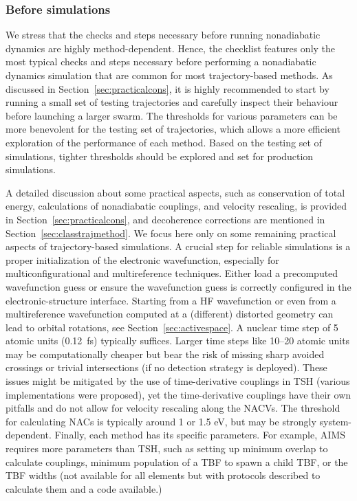 \documentclass[9pt,bestpractices]{livecoms}
\begin{document}
\subsubsection{Before simulations}
We stress that the checks and steps necessary before running nonadiabatic dynamics are highly method-dependent. Hence, the checklist features only the most typical checks and steps necessary before performing a nonadiabatic dynamics simulation that are common for most trajectory-based methods. As discussed in Section~\ref{sec:practicalcons}, it is highly recommended to start by running a small set of testing trajectories and carefully inspect their behaviour before launching a larger swarm. The thresholds for various parameters can be more benevolent for the testing set of trajectories, which allows a more efficient exploration of the performance of each method. Based on the testing set of simulations, tighter thresholds should be explored and set for production simulations.

A detailed discussion about some practical aspects, such as conservation of total energy, calculations of nonadiabatic couplings, and velocity rescaling, is provided in Section~\ref{sec:practicalcons}, and decoherence corrections are mentioned in Section~\ref{sec:classtrajmethod}. We focus here only on some remaining practical aspects of trajectory-based simulations. A crucial step for reliable simulations is a proper initialization of the electronic wavefunction, especially for multiconfigurational and multireference techniques. Either load a precomputed wavefunction guess or ensure the wavefunction guess is correctly configured in the electronic-structure interface. Starting from a HF wavefunction or even from a multireference wavefunction computed at a (different) distorted geometry can lead to orbital rotations, see Section~\ref{sec:activespace}. 
A nuclear time step of 5 atomic units (0.12~fs) typically suffices. Larger time steps like 10–20 atomic units may be computationally cheaper but bear the risk of missing sharp avoided crossings or trivial intersections (if no detection strategy is deployed). These issues might be mitigated by the use of time-derivative couplings in TSH (various implementations were proposed), yet the time-derivative couplings have their own pitfalls and do not allow for velocity rescaling along the NACVs. The threshold for calculating NACs is typically around 1 or 1.5 eV, but may be strongly system-dependent.
Finally, each method has its specific parameters. For example, AIMS requires more parameters than TSH,\cite{lassmann2023} such as setting up minimum overlap to calculate couplings, minimum population of a TBF to spawn a child TBF, or the TBF widths (not available for all elements but with protocols described to calculate them\cite{THOMPSON201070width,esch2019widthlevine} and a code available.\cite{yorick_lassmann_2022_7382685})
\end{document}
